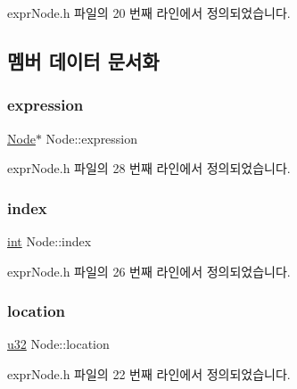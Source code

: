expr\+Node.\+h 파일의 20 번째 라인에서 정의되었습니다.



\subsection{멤버 데이터 문서화}
\mbox{\label{struct_node_a1a1f36a3a65310a67b4e6e10b595d5a4}} 
\subsubsection{\texorpdfstring{expression}{expression}}
{\footnotesize\ttfamily \mbox{\hyperlink{struct_node}{Node}}$\ast$ Node\+::expression}



expr\+Node.\+h 파일의 28 번째 라인에서 정의되었습니다.

\mbox{\label{struct_node_ac8055cdbda20cacce417192557741ab8}} 
\subsubsection{\texorpdfstring{index}{index}}
{\footnotesize\ttfamily \mbox{\hyperlink{_util_8cpp_a0ef32aa8672df19503a49fab2d0c8071}{int}} Node\+::index}



expr\+Node.\+h 파일의 26 번째 라인에서 정의되었습니다.

\mbox{\label{struct_node_af29d6730c1ae4dfa7a901ae7611b0973}} 
\subsubsection{\texorpdfstring{location}{location}}
{\footnotesize\ttfamily \mbox{\hyperlink{_system_8h_a10e94b422ef0c20dcdec20d31a1f5049}{u32}} Node\+::location}



expr\+Node.\+h 파일의 22 번째 라인에서 정의되었습니다.

\mbox{\label{struct_node_a844bc1a892e4efae954736f91a068ba2}} 
